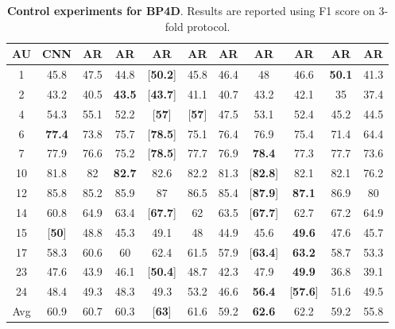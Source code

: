 \documentclass[5p,twocolumn]{elsarticle}
\begin{document}
 \begin{table*}[!htbp]
	\scriptsize
	\centering
	
	\setlength{\abovecaptionskip}{0pt} 
	
	\caption{\textbf{Control experiments for BP4D}. Results are reported using F1 score on 3-fold protocol.}
	\label{tab:BP4D_control_expr}
	
	\centering
	\tabcolsep=0.05cm
	\begin{tabular}{c*{10}{c}}
		
		\toprule
		AU & CNN & AR & AR & AR & AR & AR & AR & AR & AR & AR \\
		\midrule
		1 & 45.8 & 47.5 & 44.8 & [\textbf{50.2}] & 45.8 & 46.4 & 48 & 46.6& \textbf{50.1}& 41.3 \\
		2 & 43.2 & 40.5 & \textbf{43.5} & [\textbf{43.7}] & 41.1 & 40.7 & 43.2 & 42.1 &35 & 37.4 \\
		4 & 54.3 & 55.1 & 52.2 & [\textbf{57}] & [\textbf{57}] & 47.5 & 53.1 & 52.4 &45.2 & 44.5 \\
		6 & \textbf{77.4} & 73.8 & 75.7 & [\textbf{78.5}] & 75.1 & 76.4 & 76.9 & 75.4 &71.4 & 64.4 \\
		7 & 77.9 & 76.6 & 75.2 & [\textbf{78.5}] & 77.7 & 76.9 & \textbf{78.4} & 77.3 & 77.7 & 73.6 \\
		10 & 81.8 & 82 & \textbf{82.7} & 82.6 & 82.2 & 81.3 & [\textbf{82.8}] & 82.1 & 82.1 & 76.2 \\
		12 & 85.8 & 85.2 & 85.9 & 87 & 86.5 & 85.4 & [\textbf{87.9}] & \textbf{87.1} &86.9 & 80 \\
		14 & 60.8 & 64.9 & 63.4 & [\textbf{67.7}] & 62 & 63.5 & [\textbf{67.7}] & 62.7 &67.2 & 64.9 \\
		15 & [\textbf{50}] & 48.8 & 45.3 & 49.1 & 48 & 44.9 & 45.6 & \textbf{49.6}& 47.6& 45.7 \\
		17 & 58.3 & 60.6 & 60 & 62.4 & 61.5 & 57.9 & [\textbf{63.4}] & \textbf{63.2} & 58.7& 53.3 \\
		23 & 47.6 & 43.9 & 46.1 & [\textbf{50.4}] & 48.7 & 42.3 & 47.9 & \textbf{49.9} &36.8& 39.1 \\
		24 & 48.4 & 49.3 & 48.3 & 49.3 & 53.2 & 46.6 & \textbf{56.4} & [\textbf{57.6}] &51.6 & 49.5 \\
		\midrule
		Avg & 60.9 & 60.7 & 60.3 & [\textbf{63}] & 61.6 & 59.2 & \textbf{62.6} & 62.2 &59.2& 55.8 \\
		\bottomrule
	\end{tabular}
	\vspace{0.0cm}
\end{table*}
\end{document}
